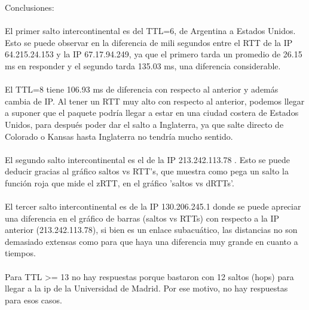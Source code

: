 Conclusiones: \\ \\

El primer salto intercontinental es del TTL=6, de Argentina a Estados Unidos. Esto se puede observar en la diferencia de mili segundos entre 
el RTT de la IP 64.215.24.153 y la IP 67.17.94.249, ya que el primero tarda un promedio de 26.15 ms en responder y el segundo tarda 135.03 ms,
una diferencia considerable. \\ \\

El TTL=8 tiene 106.93 ms de diferencia con respecto al anterior y además cambia de IP. Al tener un RTT muy alto con respecto al anterior,
podemos llegar a suponer que el paquete podría llegar a estar en una ciudad costera de Estados Unidos, para después poder dar el salto a Inglaterra,
ya que salte directo de Colorado o Kansas hasta Inglaterra no tendría mucho sentido. \\ \\

El segundo salto intercontinental es el de la IP 213.242.113.78 . Esto se puede deducir gracias al gráfico saltos vs RTT's, que muestra como pega un
salto la función roja que mide el zRTT, en el gráfico 'saltos vs dRTTs'.\\ \\

El tercer salto intercontinental es de la IP 130.206.245.1 donde se puede apreciar una diferencia en el gráfico de barras 
(saltos vs RTTs) con respecto a la IP anterior (213.242.113.78), si bien es un enlace subacuático,
las distancias no son demasiado extensas como para que haya una diferencia muy grande en cuanto a tiempos. \\ \\

Para TTL >= 13 no hay respuestas porque bastaron con 12 saltos (hops) para llegar a la ip de la Universidad de Madrid. Por ese motivo, 
no hay respuestas para esos casos. \\ \\ 










\pagebreak


